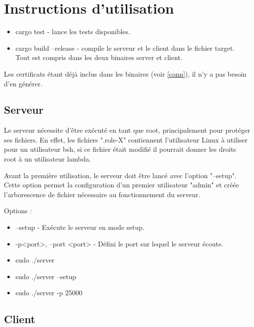 \documentclass[french]{article}
\begin{document}
\section{Instructions d'utilisation}

\begin{itemize}
	\item cargo test - lance les tests disponibles.
	\item cargo build --release - compile le serveur et le client dans le fichier target. Tout est compris dans les deux binaires server et client.
\end{itemize}

Les certificats étant déjà inclus dans les binaires (voir \ref{conn}), il n'y a pas besoin d'en générer.

\subsection{Serveur}

Le serveur nécessite d'être exécuté en tant que root, principalement pour protéger ses fichiers. En effet, les fichiers ".role-X" contiennent l'utilisateur Linux à utiliser pour un utilisateur bsh, si ce fichier était modifié il pourrait donner les droits root à un utilisateur lambda.

\medspace

Avant la première utilisation, le serveur doit être lancé avec l'option "--setup". Cette option permet la configuration d'un premier utilisateur "admin" et créée l'arborescence de fichier nécessaire au fonctionnement du serveur.

\medspace

Options :
\begin{itemize}
	\item --setup - Exécute le serveur en mode setup.
	\item -p<port>, --port <port> - Défini le port sur lequel le serveur écoute.
\end{itemize}

\medspace

\begin{itemize}
	\item sudo ./server
	\item sudo ./server --setup
	\item sudo ./server -p 25000
\end{itemize}

\subsection{Client}
\end{document}
